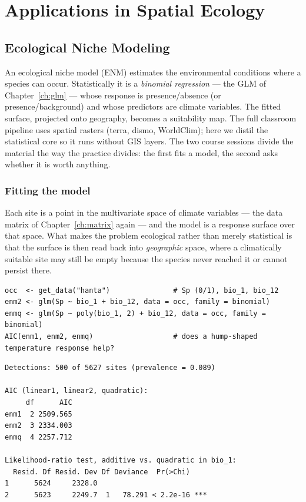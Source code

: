 \documentclass[11pt,oneside]{book}
\newcommand{\pkg}[1]{\textsf{#1}}
\begin{document}
\part{Applications in Spatial Ecology}
\label{part:spatial}

\chapter{Ecological Niche Modeling}
\label{ch:enm}
An ecological niche model (ENM) estimates the environmental conditions where a species
can occur. Statistically it is a \emph{binomial regression} — the GLM of
Chapter~\ref{ch:glm} — whose response is presence/absence (or presence/background) and
whose predictors are climate variables. The fitted surface, projected onto geography,
becomes a suitability map. The full classroom pipeline uses spatial rasters
(\pkg{terra}, \pkg{dismo}, WorldClim); here we distil the statistical core so it runs
without GIS layers. The two course sessions divide the material the way the practice
divides: the first fits a model, the second asks whether it is worth anything.

\section{Fitting the model}
Each site is a point in the multivariate space of climate variables — the data matrix of
Chapter~\ref{ch:matrix} again — and the model is a response surface over that space.
What makes the problem ecological rather than merely statistical is that the surface is
then read back into \emph{geographic} space, where a climatically suitable site may still
be empty because the species never reached it or cannot persist there.

\begin{lstlisting}
occ  <- get_data("hanta")               # Sp (0/1), bio_1, bio_12
enm2 <- glm(Sp ~ bio_1 + bio_12, data = occ, family = binomial)
enmq <- glm(Sp ~ poly(bio_1, 2) + bio_12, data = occ, family = binomial)
AIC(enm1, enm2, enmq)                   # does a hump-shaped temperature response help?
\end{lstlisting}

\begin{lstlisting}[style=rout]
Detections: 500 of 5627 sites (prevalence = 0.089)

AIC (linear1, linear2, quadratic):
     df      AIC
enm1  2 2509.565
enm2  3 2334.003
enmq  4 2257.712

Likelihood-ratio test, additive vs. quadratic in bio_1:
  Resid. Df Resid. Dev Df Deviance  Pr(>Chi)
1      5624     2328.0
2      5623     2249.7  1   78.291 < 2.2e-16 ***
\end{lstlisting}
\end{document}
